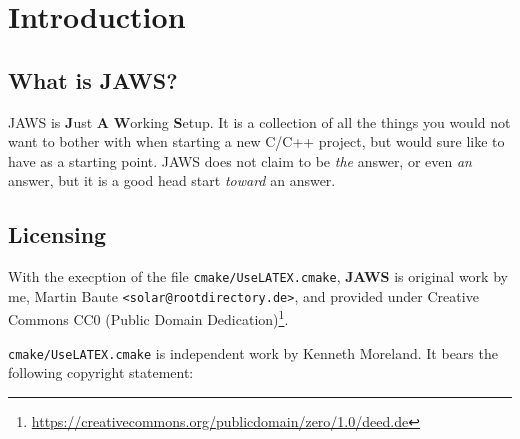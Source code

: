 
\newcommand{\doctitle}{JAWS Technical Guide}
\newcommand{\docauthors}{Martin Baute}



\section{Introduction}

\subsection{What is JAWS?}

JAWS is \textbf{J}ust \textbf{A} \textbf{W}orking \textbf{S}etup. It is a collection of all the things you would not want to bother with when starting a new C/C++ project, but would sure like to have as a starting point. JAWS does not claim to be \emph{the} answer, or even \emph{an} answer, but it is a good head start \emph{toward} an answer.

\subsection{Licensing}

With the execption of the file \lstinline{cmake/UseLATEX.cmake}, \textbf{JAWS} is original work by me, Martin Baute \lstinline{<solar@rootdirectory.de>}, and provided under Creative Commons CC0 (Public Domain Dedication)\footnote{\url{https://creativecommons.org/publicdomain/zero/1.0/deed.de}}.

\lstinline{cmake/UseLATEX.cmake} is independent work by Kenneth Moreland. It bears the following copyright statement:

